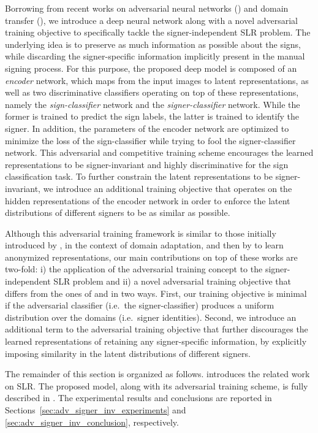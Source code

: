 Borrowing from recent works on adversarial neural networks (\citet{Goodfellow2014, Feutry2018}) and domain transfer (\citet{Ganin2015}), we introduce a deep neural network along with a novel adversarial training objective to specifically tackle the signer-independent SLR problem. The underlying idea is to preserve as much information as possible about the signs, while discarding the signer-specific information implicitly present in the manual signing process. For this purpose, the proposed deep model is composed of an \emph{encoder} network, which maps from the input images to latent representations, as well as two discriminative classifiers operating on top of these representations, namely the \emph{sign-classifier} network and the \emph{signer-classifier} network. While the former is trained to predict the sign labels, the latter is trained to identify the signer. In addition, the parameters of the encoder network are optimized to minimize the loss of the sign-classifier while trying to fool the signer-classifier network. This adversarial and competitive training scheme encourages the learned representations to be signer-invariant and highly discriminative for the sign classification task. To further constrain the latent representations to be signer-invariant, we introduce an additional training objective that operates on the hidden representations of the encoder network in order to enforce the latent distributions of different signers to be as similar as possible.

Although this adversarial training framework is similar to those initially introduced by \citet{Ganin2015}, in the context of domain adaptation, and then by \citet{Feutry2018} to learn anonymized representations, our main contributions on top of these works are two-fold: i) the application of the adversarial training concept to the signer-independent SLR problem and ii) a novel adversarial training objective that differs from the ones of \citet{Ganin2015} and \citet{Feutry2018} in two ways. First, our training objective is minimal if the adversarial classifier (i.e.\ the signer-classifier) produces a uniform distribution over the domains (i.e.\ signer identities). Second, we introduce an additional term to the adversarial training objective that further discourages the learned representations of retaining any signer-specific information, by explicitly imposing similarity in the latent distributions of different signers.

The remainder of this section is organized as follows.  introduces the related work on SLR. The proposed model, along with its adversarial training scheme, is fully described in . The experimental results and conclusions are reported in Sections~\ref{sec:adv_signer_inv_experiments} and \ref{sec:adv_signer_inv_conclusion}, respectively.

